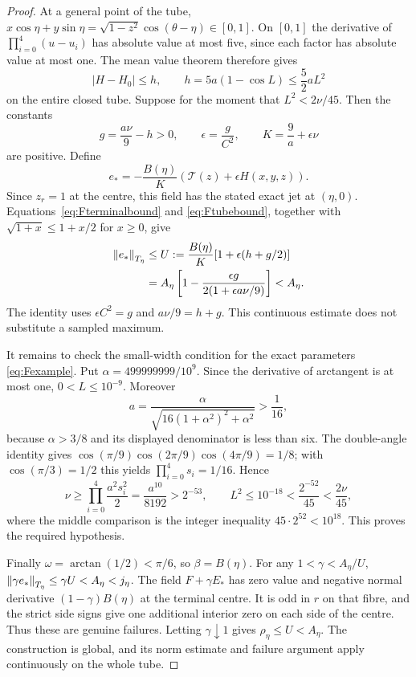 \documentclass[11pt,a4paper]{article}
\begin{document}
\begin{proof}
At a general point of the tube,
$x\cos\eta+y\sin\eta=\sqrt{1-z^2}\cos(\theta-\eta)\in[0,1]$.
On $[0,1]$ the derivative of $\prod_{i=0}^4(u-u_i)$ has
absolute value at most five, since each factor has absolute
value at most one. The mean value theorem therefore gives
\begin{equation}\label{eq:Ftubebound}
 |H-H_0|\le h,\qquad
 h=5a(1-\cos L)\le\frac52aL^2
\end{equation}
on the entire closed tube. Suppose for the moment that
$L^2<2\nu/45$. Then the constants
\[
 g=\frac{a\nu}{9}-h>0,\qquad
 \epsilon=\frac{g}{C^2},\qquad
 K=\frac9a+\epsilon\nu
\]
are positive. Define
\begin{equation}\label{eq:Fwitness}
 e_*=-\frac{B(\eta)}K(\mathcal T(z)+\epsilon H(x,y,z)).
\end{equation}
Since $z_r=1$ at the centre, this field has the stated exact
jet at $(\eta,0)$. Equations~\eqref{eq:Fterminalbound} and
\eqref{eq:Ftubebound}, together with
$\sqrt{1+x}\le1+x/2$ for $x\ge0$, give
\begin{align}
 \left\lVert e_*\right\rVert_{T_\eta}
 &\le U:=\frac{B(\eta)}K[1+\epsilon(h+g/2)] \notag\\
 &= A_\eta\left[1-\frac{\epsilon g}
                 {2(1+\epsilon a\nu/9)}\right]<A_\eta.
 \label{eq:Fupper}
\end{align}
The identity uses $\epsilon C^2=g$ and $a\nu/9=h+g$.
This continuous estimate does not substitute a sampled maximum.

It remains to check the small-width condition for the exact
parameters \eqref{eq:Fexample}. Put
$\alpha=499999999/10^9$. Since the derivative of arctangent
is at most one, $0<L\le10^{-9}$. Moreover
\[
 a=\frac{\alpha}{\sqrt{16(1+\alpha^2)^2+\alpha^2}}>
 \frac1{16},
\]
because $\alpha>3/8$ and its displayed denominator is less
than six. The double-angle identity gives
$\cos(\pi/9)\cos(2\pi/9)\cos(4\pi/9)=1/8$;
with $\cos(\pi/3)=1/2$ this yields $\prod_{i=0}^4s_i=1/16$.
Hence
\[
 \nu\ge\prod_{i=0}^4\frac{a^2s_i^2}{2}
       =\frac{a^{10}}{8192}>2^{-53},\qquad
 L^2\le10^{-18}<\frac{2^{-52}}{45}<\frac{2\nu}{45},
\]
where the middle comparison is the integer inequality
$45\cdot2^{52}<10^{18}$. This proves the required hypothesis.

Finally $\omega=\arctan(1/2)<\pi/6$, so $\beta=B(\eta)$.
For any $1<\gamma<A_\eta/U$,
$\left\lVert \gamma e_*\right\rVert_{T_\eta}\le\gamma U<A_\eta<j_\eta$.
The field $F+\gamma E_*$ has zero value and negative normal
derivative $(1-\gamma)B(\eta)$ at the terminal centre.
It is odd in $r$ on that fibre, and the strict side signs
give one additional interior zero on each side of the centre.
Thus these are genuine failures. Letting $\gamma\downarrow1$
gives $\rho_\eta\le U<A_\eta$.
The construction is global, and its norm estimate and failure
argument apply continuously on the whole tube.
\end{proof}
\end{document}

